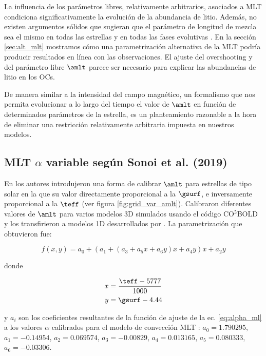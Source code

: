 La influencia de los parámetros libres, relativamente arbitrarios, asociados a MLT condiciona significativamente la evolución de la abundancia de litio. Además, no existen argumentos sólidos que sugieran que el parámetro de longitud de mezcla sea el mismo en todas las estrellas y en todas las fases evolutivas \cite{Pasetto2014}. En la sección \ref{sec:alt_mlt} mostramos cómo una parametrización alternativa de la MLT podría producir resultados en línea con las observaciones. El ajuste del overshooting y del parámetro libre $\amlt$ parece ser necesario para explicar las abundancias de litio en los OCs.\par

De manera similar a la intensidad del campo magnético, un formalismo que nos permita evolucionar a lo largo del tiempo el valor de $\amlt$ en función de determinados parámetros de la estrella, es un planteamiento razonable a la hora de eliminar una restricción relativamente arbitraria impuesta en nuestros modelos.

\subsection{MLT $\alpha$ variable según Sonoi et al. (2019)}
En \cite{Sonoi2018} los autores introdujeron una forma de calibrar $\amlt$ para estrellas de tipo solar en la que su valor directamente proporcional a la $\gsurf$, e inversamente proporcional a la $\teff$ (ver figura \ref{fig:grid_var_amlt}). Calibraron diferentes valores de $\amlt$ para varios modelos 3D simulados usando el código CO$^5$BOLD \citep{Freytag2011} y los transfirieron a modelos 1D desarrollados por \cite{Ludwig1998}. La parametrización que obtuvieron fue: 

\begin{equation}
	f(x,y) = a_0 + (a_1 + (a_3 + a_5x +a_6y)x + a_4y)x + a_2y\label{eq:alpha_ml}
\end{equation}

donde

\begin{align}
	x &= \frac{\teff-5777}{1000} \label{eq:eq:alpha_x}\\
	y &= \gsurf-4.44 \label{eq:eq:alpha_y}
\end{align}

y $a_i$ son los coeficientes resultantes de la función de ajuste de la ec. \ref{eq:alpha_ml} a los valores $\alpha$ calibrados para el modelo de convección MLT \citep{Sonoi2018}: $a_0=1.790295$, $a_1=-0.14954$, $a_2=0.069574$, $a_3=-0.00829$, $a_4=0.013165$, $a_5=0.080333$, $a_6=-0.03306$. \par

